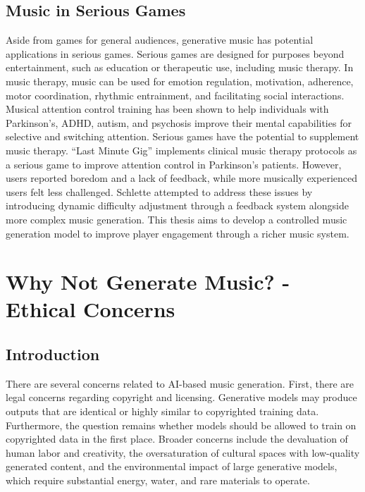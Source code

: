 \subsection{Music in Serious Games}
Aside from games for general audiences, generative music has potential applications in serious games. Serious games are designed for purposes beyond entertainment, such as education or therapeutic use, including music therapy\cite{Djaouti2011}. In music therapy, music can be used for emotion regulation, motivation, adherence, motor coordination, rhythmic entrainment, and facilitating social interactions\cite{musicwellbeing_agres_2021}. Musical attention control training has been shown to help individuals with Parkinson’s\cite{Park_Kim_2021}, ADHD\cite{Martin-Moratinos_Bella-Fernández_Blasco-Fontecilla_2023}, autism\cite{Pasiali_LaGasse_Penn_2014}, and psychosis\cite{van_Alphen_Stams_Hakvoort_2019} improve their mental capabilities for selective and switching attention. Serious games have the potential to supplement music therapy. “Last Minute Gig”\cite{Chalkiadakis_2022} implements clinical music therapy protocols as a serious game to improve attention control in Parkinson’s patients. However, users reported boredom and a lack of feedback, while more musically experienced users felt less challenged. Schlette\cite{Schlette_2022} attempted to address these issues by introducing dynamic difficulty adjustment through a feedback system alongside more complex music generation. This thesis aims to develop a controlled music generation model to improve player engagement through a richer music system.

\section{Why Not Generate Music? - Ethical Concerns} \label{section:ethical}
\subsection{Introduction}
There are several concerns related to AI-based music generation. First, there are legal concerns regarding copyright and licensing. Generative models may produce outputs that are identical or highly similar to copyrighted training data. Furthermore, the question remains whether models should be allowed to train on copyrighted data in the first place. Broader concerns include the devaluation of human labor and creativity, the oversaturation of cultural spaces with low-quality generated content, and the environmental impact of large generative models, which require substantial energy, water, and rare materials to operate.

